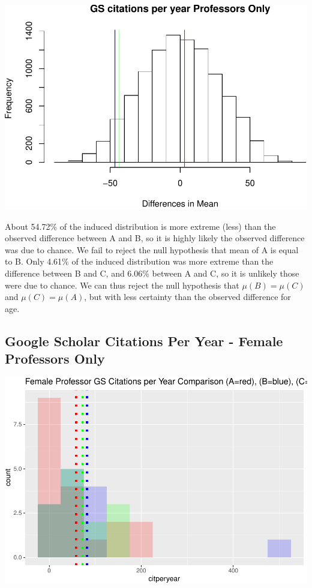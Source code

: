 \documentclass[]{article}
\begin{document}
\includegraphics{final_files/figure-latex/unnamed-chunk-72-1.pdf}

About 54.72\% of the induced distribution is more extreme (less) than
the observed difference between A and B, so it is highly likely the
observed difference was due to chance. We fail to reject the null
hypothesis that mean of A is equal to B. Only 4.61\% of the induced
distribution was more extreme than the difference between B and C, and
6.06\% between A and C, so it is unlikely those were due to chance. We
can thus reject the null hypothesis that \(\mu(B)=\mu(C)\) and
\(\mu(C)=\mu(A)\), but with less certainty than the observed difference
for age.

\hypertarget{google-scholar-citations-per-year---female-professors-only}{%
\subsection{Google Scholar Citations Per Year - Female Professors
Only}\label{google-scholar-citations-per-year---female-professors-only}}

\includegraphics{final_files/figure-latex/unnamed-chunk-74-1.pdf}
\end{document}

